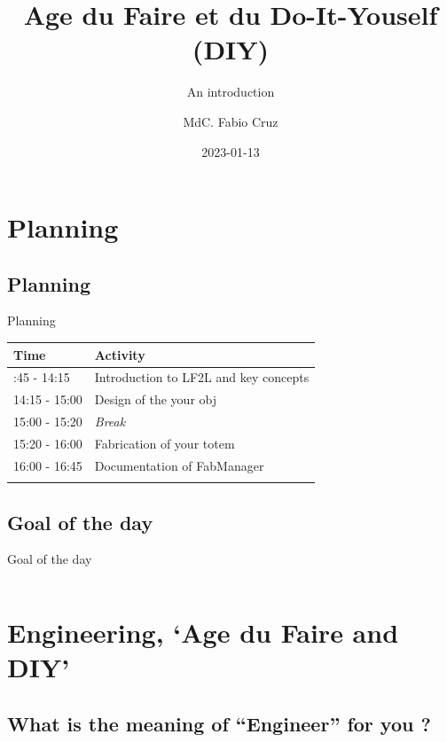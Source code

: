 \documentclass[
  ignorenonframetext,
  aspectratio=169,
  c]{beamer}
\title{Age du Faire et du Do-It-Youself (DIY)}
\subtitle{An introduction}
\author{MdC. Fabio Cruz}
\date{2023-01-13}
\institute{Université de Lorraine \textbar{} ENSGSI}
\begin{document}
\frame{\titlepage}

\section{Planning}\label{planning}

\subsection{Planning}\label{planning-1}

\begin{frame}{Planning}
\begin{longtable}[]{@{}ll@{}}
\toprule\noalign{}
\textbf{Time} & \textbf{Activity} \\
\midrule\noalign{}
\endhead
13:45 - 14:15 & Introduction to LF2L and key concepts \\
14:15 - 15:00 & Design of the your obj \\
15:00 - 15:20 & \emph{Break} 🍏 \\
15:20 - 16:00 & Fabrication of your totem \\
16:00 - 16:45 & Documentation of FabManager \\
\bottomrule\noalign{}
\end{longtable}
\end{frame}

\subsection{Goal of the day}\label{goal-of-the-day}

\begin{frame}{Goal of the day}
\begin{columns}[T]
\begin{column}{0.48\textwidth}
\end{column}

\begin{column}{0.48\textwidth}
\end{column}
\end{columns}
\end{frame}

\section{Engineering, `Age du Faire and
DIY'}\label{engineering-age-du-faire-and-diy}

\subsection{What is the meaning of ``Engineer'' for you
?}\label{what-is-the-meaning-of-engineer-for-you}
\end{document}
